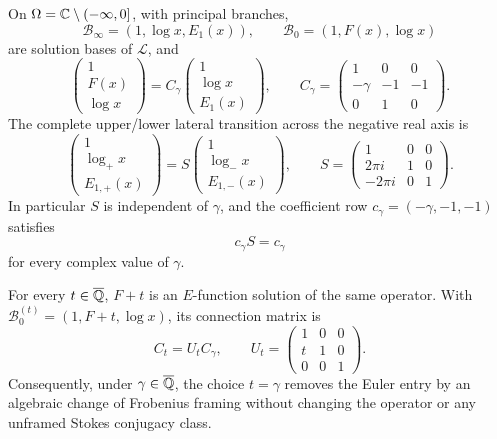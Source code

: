 \begin{theorem}
\label{thm:stokes-framing}
On \(\Omega=\mathbb C\setminus(-\infty,0]\), with principal branches,
\[
 \mathcal B_\infty=(1,\log x,E_1(x)),
 \qquad
 \mathcal B_0=(1,F(x),\log x)
\]
are solution bases of \(\mathcal L\), and
\begin{equation}\label{eq:C-gamma}
 \begin{pmatrix}1\\F(x)\\\log x\end{pmatrix}
 =C_\gamma
 \begin{pmatrix}1\\\log x\\E_1(x)\end{pmatrix},
 \qquad
 C_\gamma=
 \begin{pmatrix}
 1&0&0\\
 -\gamma&-1&-1\\
 0&1&0
 \end{pmatrix}.
\end{equation}
The complete upper/lower lateral transition across the negative real axis is
\begin{equation}\label{eq:stokes-transition}
 \begin{pmatrix}1\\\log_+x\\E_{1,+}(x)\end{pmatrix}
 =S
 \begin{pmatrix}1\\\log_-x\\E_{1,-}(x)\end{pmatrix},
 \qquad
 S=
 \begin{pmatrix}
 1&0&0\\
 2\pi i&1&0\\
 -2\pi i&0&1
 \end{pmatrix}.
\end{equation}
In particular \(S\) is independent of \(\gamma\), and the coefficient row
\(c_\gamma=(-\gamma,-1,-1)\) satisfies
\begin{equation}\label{eq:stokes-cocycle-blind}
 \boxed{c_\gamma S=c_\gamma}
\end{equation}
for every complex value of \(\gamma\).

For every \(t\in\overline{\mathbb Q}\), \(F+t\) is an \(E\)-function solution of the same
operator.  With \(\mathcal B_0^{(t)}=(1,F+t,\log x)\), its connection
matrix is
\begin{equation}\label{eq:framing-shear}
 C_t=U_tC_\gamma,
 \qquad
 U_t=\begin{pmatrix}1&0&0\\t&1&0\\0&0&1\end{pmatrix}.
\end{equation}
Consequently, under \(\gamma\in\overline{\mathbb Q}\), the choice \(t=\gamma\) removes
the Euler entry by an algebraic change of Frobenius framing without changing
the operator or any unframed Stokes conjugacy class.
\end{theorem}

